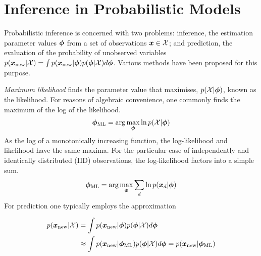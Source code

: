 

\newcommand \zd   { { \vv{z}_d } }
\newcommand \qfam { { \mathcal{Q} } }
\newcommand \xdat { { \mathcal{X} } }
\newcommand \zdat { { \mathcal{Z} } }
\newcommand \xnew { { \vv{x}_{\text{new}} } }
\newcommand \znew { { \vv{z}_{\text{new}} } }
\newcommand \param { { \vv{\phi} } }
\newcommand \ml[1] { { {#1}_{\text{ML}} } } 
\newcommand \map[1] { { {#1}_{\text{MAP}} } } 
\newcommand \quarter { { \oneover{4} } }
\newcommand \eighth { { \oneover{8} } }
\newcommand \fqt[1] { { \mathcal{F}\left( {#1} \right) } }
\newcommand \joint { { p(\xdat, \zdat | \param) } }
\newcommand \logjoint { { \ln \joint } }
\newcommand \exlogjoint[1] { { \ex{\logjoint}{{#1}} } }

\section{Inference in Probabilistic Models}
Probabilistic inference is concerned with two problems: inference, the estimation parameter values $\param$ from a set of observations $\vv{x} \in \xdat$; and prediction, the evaluation of the probability of unobserved variables $p(\xnew | \xdat) = \int p(\xnew | \param) p(\param | \xdat) d\param$. Various methods have been proposed for this purpose.

\emph{Maximum likelihood} finds the parameter value that maximises, $p(\xdat|\param)$, known as the likelihood. For reasons of algebraic convenience, one commonly finds the maximum of the log of the likelihood.\begin{align}
\ml{\param} = \arg \max_{\param} \ln p(\xdat | \param)
\end{align}
As the log of a monotonically increasing function, the log-likelihood and likelihood have the same maxima. For the particular case of independently and identically distributed (IID) observations, the log-likelihood factors into a simple sum.
\begin{align}
\ml{\param} = \arg \max_{\param} \sum_d \ln p(\xd | \param)
\end{align}
For prediction one typically employs the approximation

\begin{align}
p(\xnew | \xdat) 
&= \int p(\xnew | \param) p(\param | \xdat) d\param \\
&\approx \int p(\xnew | \ml{\param}) p(\param | \xdat) d\param
=  p(\xnew | \ml{\param})
\end{align}

